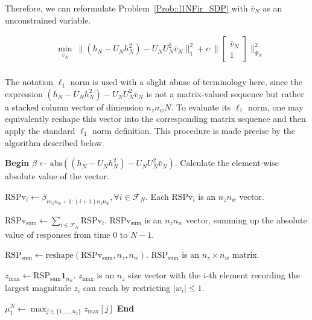 Therefore, we can reformulate Problem~\ref{Prob::l1NFir_SDP} with \(\bar{v}_N\) as an unconstrained variable.
\begin{opt}[QP implementation]\label{Prob::l1NFir_QP_tech}
\begin{equation}
\begin{split}
    & \underset{\bar{v}_N}{\min}\ \|(h_N - U_N h_N^2) -U_N U_N^2 \bar{v}_N\|_1^2 + c \cdot \|\begin{bmatrix}
    \bar{v}_N \\ 1
    \end{bmatrix} \|_{\Psi_N}^2\\
\end{split}
\end{equation}
\end{opt}
\begin{rem}
The notation $\ell_1$ norm is used with a slight abuse of terminology here, since the expression $(h_N - U_N h_N^2) - U_N U_N^2 \bar{v}_N$ is not a matrix-valued sequence but rather a stacked column vector of dimension $n_z n_w N$. To evaluate its $\ell_1$ norm, one may equivalently reshape this vector into the corresponding matrix sequence and then apply the standard $\ell_1$ norm definition. This procedure is made precise by the algorithm described below.
\begin{algorithm}
\caption{Vecotorized finite response sequence \(\ell_1\) norm evaluation}\label{alg::FRl1cal}
\begin{algorithmic}[1]
\State \textbf{Begin}
\State \(\beta \gets \mathrm{abs}((h_N - U_N h_N^2) -U_N U_N^2 \bar{v}_N)\). Calculate the element-wise absolute value of the vector.

\State \(\mathrm{RSPv}_i \gets \beta_{i n_z n_w +1 \colon (i + 1) n_z n_w}, \forall i\in \mathcal{F}_N\). Each \(\mathrm{RSPv}_i\) is an \(n_z n_w\) vector.

\State \(\mathrm{RSPv}_\mathrm{sum}  \gets \sum_{i\in \mathcal{F}_N} \mathrm{RSPv}_i\). \(\mathrm{RSPv}_\mathrm{sum}\) is an \(n_z n_w\) vector, summing up the absolute value of responses from time \(0\) to \(N - 1\).

\State \(\mathrm{RSP}_\mathrm{sum} \gets \mathrm{reshape} (\mathrm{RSPv}_\mathrm{sum}, n_z, n_w)\). \(\mathrm{RSP}_\mathrm{sum}\) is an \(n_z \times n_w\) matrix.

\State \(z_\mathrm{max} \gets \mathrm{RSP}_\mathrm{sum} \mathbf{1}_{n_w}\). \(z_\mathrm{max}\) is an \(n_z\) size vector with the \(i\)-th element recording the largest magnitude \(z_i\) can reach by restricting \(|w_i| \le 1\).

\State \(\mu_1^N \gets \max_{j \in \{1, \hdots, n_z\}} z_\mathrm{max}[j]\)
\State \textbf{End}
\end{algorithmic}
\end{algorithm}
\end{rem}